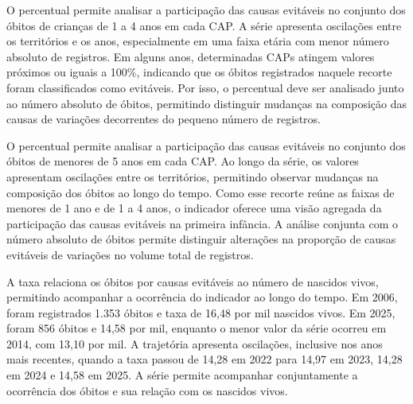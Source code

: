 
O percentual permite analisar a participação das causas evitáveis no conjunto dos óbitos de crianças de 1 a 4 anos em cada CAP. A série apresenta oscilações entre os territórios e os anos, especialmente em uma faixa etária com menor número absoluto de registros. Em alguns anos, determinadas CAPs atingem valores próximos ou iguais a 100\%, indicando que os óbitos registrados naquele recorte foram classificados como evitáveis. Por isso, o percentual deve ser analisado junto ao número absoluto de óbitos, permitindo distinguir mudanças na composição das causas de variações decorrentes do pequeno número de registros.


O percentual permite analisar a participação das causas evitáveis no conjunto dos óbitos de menores de 5 anos em cada CAP. Ao longo da série, os valores apresentam oscilações entre os territórios, permitindo observar mudanças na composição dos óbitos ao longo do tempo. Como esse recorte reúne as faixas de menores de 1 ano e de 1 a 4 anos, o indicador oferece uma visão agregada da participação das causas evitáveis na primeira infância. A análise conjunta com o número absoluto de óbitos permite distinguir alterações na proporção de causas evitáveis de variações no volume total de registros.


A taxa relaciona os óbitos por causas evitáveis ao número de nascidos vivos, permitindo acompanhar a ocorrência do indicador ao longo do tempo. Em 2006, foram registrados 1.353 óbitos e taxa de 16,48 por mil nascidos vivos. Em 2025, foram 856 óbitos e 14,58 por mil, enquanto o menor valor da série ocorreu em 2014, com 13,10 por mil. A trajetória apresenta oscilações, inclusive nos anos mais recentes, quando a taxa passou de 14,28 em 2022 para 14,97 em 2023, 14,28 em 2024 e 14,58 em 2025. A série permite acompanhar conjuntamente a ocorrência dos óbitos e sua relação com os nascidos vivos.

